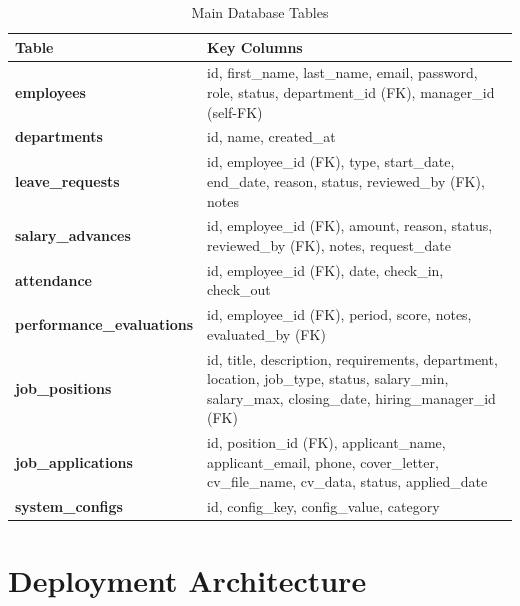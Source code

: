 \documentclass[12pt,a4paper]{report}
\begin{document}
\begin{table}[H]
\centering
\caption{Main Database Tables}
\label{tab:db_tables}
\begin{tabular}{|C{3.6cm}|L{9.6cm}|}
\hline
{}
\textbf{Table} & \textbf{Key Columns} \\
\hline
\textbf{employees} &
  id, first\_name, last\_name, email, password, role, status,
  department\_id (FK), manager\_id (self-FK) \\
\hline
\textbf{departments} &
  id, name, created\_at \\
\hline
\textbf{leave\_requests} &
  id, employee\_id (FK), type, start\_date, end\_date, reason,
  status, reviewed\_by (FK), notes \\
\hline
\textbf{salary\_advances} &
  id, employee\_id (FK), amount, reason, status,
  reviewed\_by (FK), notes, request\_date \\
\hline
\textbf{attendance} &
  id, employee\_id (FK), date, check\_in, check\_out \\
\hline
\textbf{performance\_evaluations} &
  id, employee\_id (FK), period, score, notes, evaluated\_by (FK) \\
\hline
\textbf{job\_positions} &
  id, title, description, requirements, department, location,
  job\_type, status, salary\_min, salary\_max, closing\_date,
  hiring\_manager\_id (FK) \\
\hline
\textbf{job\_applications} &
  id, position\_id (FK), applicant\_name, applicant\_email, phone,
  cover\_letter, cv\_file\_name, cv\_data, status, applied\_date \\
\hline
\textbf{system\_configs} &
  id, config\_key, config\_value, category \\
\hline
\end{tabular}
\end{table}

\section{Deployment Architecture}
\end{document}
